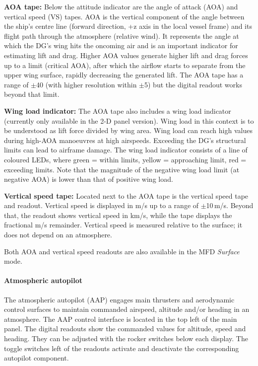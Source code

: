\documentclass[Orbiter User Manual.tex]{subfiles}
\begin{document}
\textbf{AOA tape:}
Below the attitude indicator are the angle of attack (AOA) and vertical speed
(VS) tapes. AOA is the vertical component of the angle between the ship's centre
line (forward direction, +z axis in the local vessel frame) and its flight path
through the atmosphere (relative wind). It represents the angle at which the
DG's wing hits the oncoming air and is an important indicator for estimating
lift and drag. Higher AOA values generate higher lift and drag forces up to a
limit (critical AOA), after which the airflow starts to separate from the upper
wing surface, rapidly decreasing the generated lift. The AOA tape has a range of
$\pm$40\deg{} (with higher resolution within $\pm$5\deg) but the digital readout
works beyond that limit.

\textbf{Wing load indicator:}
The AOA tape also includes a wing load indicator (currently only available in
the 2-D panel version). Wing load in this context is to be understood as lift
force divided by wing area. Wing load can reach high values during high-AOA
manoeuvres at high airspeeds. Exceeding the DG's structural limits can lead to
airframe damage. The wing load indicator consists of a line of coloured LEDs,
where green = within limits, yellow = approaching limit, red = exceeding limits.
Note that the magnitude of the negative wing load limit (at negative AOA) is
lower than that of positive wing load.

\textbf{Vertical speed tape:}
Located next to the AOA tape is the vertical speed tape and readout. Vertical
speed is displayed in m/s up to a range of $\pm$10\,m/s. Beyond that,
the readout shows vertical speed in km/s, while the tape displays the fractional
m/s remainder. Vertical speed is measured relative to the surface; it does not
depend on an atmosphere.

Both AOA and vertical speed readouts are also available in the MFD
\emph{Surface} mode.


\paragraph{Atmospheric autopilot}
\label{para:dg_aap}
The atmospheric autopilot (AAP) engages main thrusters and aerodynamic control
surfaces to maintain commanded airspeed, altitude and/or heading in an
atmosphere. The AAP control interface is located in the top left of the main
panel. The digital readouts show the commanded values for altitude, speed and
heading. They can be adjusted with the rocker switches below each display. The
toggle switches left of the readouts activate and deactivate the corresponding
autopilot component.
\end{document}
